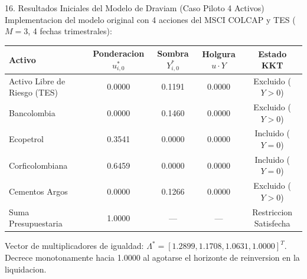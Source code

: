 \documentclass[aspectratio=169,10pt]{beamer}
\begin{document}
\begin{frame}{16. Resultados Iniciales del Modelo de Draviam (Caso Piloto 4 Activos)}
  Implementacion del modelo original con 4 acciones del MSCI COLCAP y TES ($M=3$, 4 fechas trimestrales):
  \vspace{0.2cm}
  \begin{table}[h]
    \centering
    \small
    \setlength{\tabcolsep}{5pt}
    \begin{tabular}{lcccc}
      \toprule
      Activo & Ponderacion $u_{i,0}^*$ & Sombra $Y_{i,0}^*$ & Holgura $u \cdot Y$ & Estado KKT \\
      \midrule
      Activo Libre de Riesgo (TES) & 0.0000 & 0.1191 & 0.0000 & Excluido ($Y > 0$) \\
      Bancolombia & 0.0000 & 0.1460 & 0.0000 & Excluido ($Y > 0$) \\
      Ecopetrol & 0.3541 & 0.0000 & 0.0000 & Incluido ($Y = 0$) \\
      Corficolombiana & 0.6459 & 0.0000 & 0.0000 & Incluido ($Y = 0$) \\
      Cementos Argos & 0.0000 & 0.1266 & 0.0000 & Excluido ($Y > 0$) \\
      \midrule
      Suma Presupuestaria & 1.0000 & --- & --- & Restriccion Satisfecha \\
      \bottomrule
    \end{tabular}
  \end{table}
  \vspace{0.2cm}
  Vector de multiplicadores de igualdad: $\Lambda^* = [1.2899, 1.1708, 1.0631, 1.0000]^T$.
  Decrece monotonamente hacia 1.0000 al agotarse el horizonte de reinversion en la liquidacion.
\end{frame}
\end{document}
